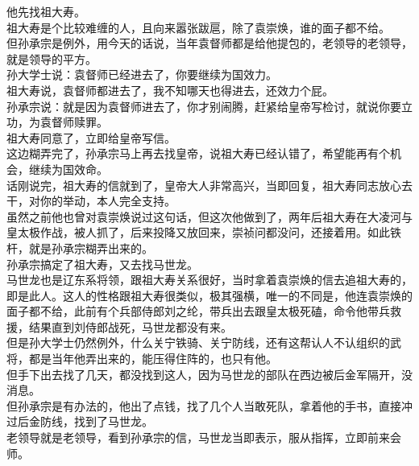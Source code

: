 \begin{multicols}{\theparacolNo}
他先找祖大寿。\\

祖大寿是个比较难缠的人，且向来嚣张跋扈，除了袁崇焕，谁的面子都不给。\\

但孙承宗是例外，用今天的话说，当年袁督师都是给他提包的，老领导的老领导，就是领导的平方。\\

孙大学士说：袁督师已经进去了，你要继续为国效力。\\

祖大寿说，袁督师都进去了，我不知哪天也得进去，还效力个屁。\\

孙承宗说：就是因为袁督师进去了，你才别闹腾，赶紧给皇帝写检讨，就说你要立功，为袁督师赎罪。\\

祖大寿同意了，立即给皇帝写信。\\

这边糊弄完了，孙承宗马上再去找皇帝，说祖大寿已经认错了，希望能再有个机会，继续为国效命。\\

话刚说完，祖大寿的信就到了，皇帝大人非常高兴，当即回复，祖大寿同志放心去干，对你的举动，本人完全支持。\\

虽然之前他也曾对袁崇焕说过这句话，但这次他做到了，两年后祖大寿在大凌河与皇太极作战，被人抓了，后来投降又放回来，崇祯问都没问，还接着用。如此铁杆，就是孙承宗糊弄出来的。\\

孙承宗搞定了祖大寿，又去找马世龙。\\

马世龙也是辽东系将领，跟祖大寿关系很好，当时拿着袁崇焕的信去追祖大寿的，即是此人。这人的性格跟祖大寿很类似，极其强横，唯一的不同是，他连袁崇焕的面子都不给，此前有个兵部侍郎刘之纶，带兵出去跟皇太极死磕，命令他带兵救援，结果直到刘侍郎战死，马世龙都没有来。\\

但是孙大学士仍然例外，什么关宁铁骑、关宁防线，还有这帮认人不认组织的武将，都是当年他弄出来的，能压得住阵的，也只有他。\\

但手下出去找了几天，都没找到这人，因为马世龙的部队在西边被后金军隔开，没消息。\\

但孙承宗是有办法的，他出了点钱，找了几个人当敢死队，拿着他的手书，直接冲过后金防线，找到了马世龙。\\

老领导就是老领导，看到孙承宗的信，马世龙当即表示，服从指挥，立即前来会师。\\


\end{multicols}
